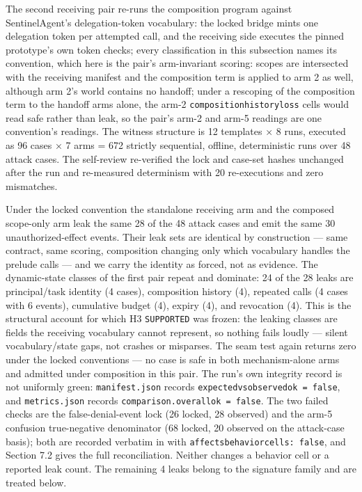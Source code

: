 \documentclass[
  10pt,
]{article}
\renewcommand{\_}{\origunderscore\allowbreak}
\begin{document}
The second receiving pair re-runs the composition program against
SentinelAgent's delegation-token vocabulary: the locked bridge mints one
delegation token per attempted call, and the receiving side executes the
pinned prototype's own token checks; every classification in this
subsection names its convention, which here is the pair's arm-invariant
scoring: scopes are intersected with the receiving manifest and the
composition term is applied to arm 2 as well, although arm 2's world
contains no handoff; under a rescoping of the composition term to the
handoff arms alone, the arm-2 \texttt{composition\_history\_loss} cells
would read safe rather than leak, so the pair's arm-2 and arm-5 readings
are one convention's readings. The witness structure is 12 templates × 8
runs, executed as 96 cases × 7 arms = 672 strictly sequential, offline,
deterministic runs over 48 attack cases. The self-review re-verified the
lock and case-set hashes unchanged after the run and re-measured
determinism with 20 re-executions and zero mismatches.

Under the locked convention the standalone receiving arm and the
composed scope-only arm leak the same 28 of the 48 attack cases and emit
the same 30 unauthorized-effect events. Their leak sets are identical by
construction --- same contract, same scoring, composition changing only
which vocabulary handles the prelude calls --- and we carry the identity
as forced, not as evidence. The dynamic-state classes of the first pair
repeat and dominate: 24 of the 28 leaks are principal/task identity (4
cases), composition history (4), repeated calls (4 cases with 6 events),
cumulative budget (4), expiry (4), and revocation (4). This is the
structural account for which H3 \texttt{SUPPORTED} was frozen: the
leaking classes are fields the receiving vocabulary cannot represent, so
nothing fails loudly --- silent vocabulary/state gaps, not crashes or
misparses. The seam test again returns zero under the locked conventions
--- no case is safe in both mechanism-alone arms and admitted under
composition in this pair. The run's own integrity record is not
uniformly green: \texttt{manifest.json} records
\texttt{expected\_vs\_observed\_ok\ =\ false}, and \texttt{metrics.json}
records \texttt{comparison.overall\_ok\ =\ false}. The two failed checks
are the false-denial-event lock (26 locked, 28 observed) and the arm-5
confusion true-negative denominator (68 locked, 20 observed on the
attack-case basis); both are recorded verbatim in
 with
\texttt{affects\_behavior\_cells:\ false}, and Section 7.2 gives the
full reconciliation. Neither changes a behavior cell or a reported leak
count. The remaining 4 leaks belong to the signature family and are
treated below.
\end{document}

